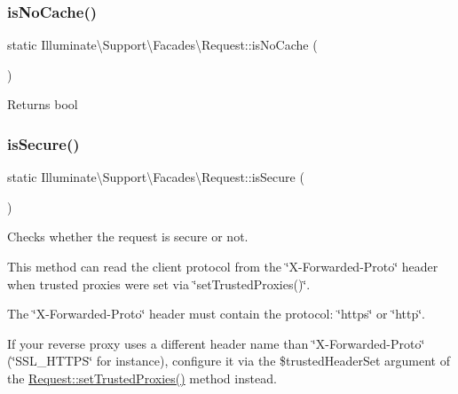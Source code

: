\subsubsection{\texorpdfstring{is\+No\+Cache()}{isNoCache()}}
{\footnotesize\ttfamily static Illuminate\textbackslash{}\+Support\textbackslash{}\+Facades\textbackslash{}\+Request\+::is\+No\+Cache (\begin{DoxyParamCaption}{ }\end{DoxyParamCaption})\hspace{0.3cm}{\ttfamily [static]}}

\begin{DoxyReturn}{Returns}
bool 
\end{DoxyReturn}
\mbox{\label{class_illuminate_1_1_support_1_1_facades_1_1_request_a9a401927e509ddb652b5656407b37bf2}} 
\subsubsection{\texorpdfstring{is\+Secure()}{isSecure()}}
{\footnotesize\ttfamily static Illuminate\textbackslash{}\+Support\textbackslash{}\+Facades\textbackslash{}\+Request\+::is\+Secure (\begin{DoxyParamCaption}{ }\end{DoxyParamCaption})\hspace{0.3cm}{\ttfamily [static]}}

Checks whether the request is secure or not.

This method can read the client protocol from the \char`\"{}\+X-\/\+Forwarded-\/\+Proto\char`\"{} header when trusted proxies were set via \char`\"{}set\+Trusted\+Proxies()\char`\"{}.

The \char`\"{}\+X-\/\+Forwarded-\/\+Proto\char`\"{} header must contain the protocol\+: \char`\"{}https\char`\"{} or \char`\"{}http\char`\"{}.

If your reverse proxy uses a different header name than \char`\"{}\+X-\/\+Forwarded-\/\+Proto\char`\"{} (\char`\"{}\+S\+S\+L\+\_\+\+H\+T\+T\+P\+S\char`\"{} for instance), configure it via the \$trusted\+Header\+Set argument of the \mbox{\hyperlink{class_illuminate_1_1_support_1_1_facades_1_1_request_a1686fbcf12f72ed06a19adf0633054fa}{Request\+::set\+Trusted\+Proxies()}} method instead.

